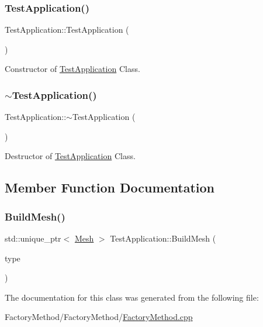 \subsubsection{\texorpdfstring{TestApplication()}{TestApplication()}}
{\footnotesize\ttfamily Test\+Application\+::\+Test\+Application (\begin{DoxyParamCaption}{ }\end{DoxyParamCaption})}



Constructor of \mbox{\hyperlink{class_test_application}{Test\+Application}} Class. 

\mbox{\label{class_test_application_ab2701e0dc10fdeabe85044794f1b334c}} 
\subsubsection{\texorpdfstring{$\sim$TestApplication()}{~TestApplication()}}
{\footnotesize\ttfamily Test\+Application\+::$\sim$\+Test\+Application (\begin{DoxyParamCaption}{ }\end{DoxyParamCaption})}



Destructor of \mbox{\hyperlink{class_test_application}{Test\+Application}} Class. 



\subsection{Member Function Documentation}
\mbox{\label{class_test_application_a5bab36dee766e9d86f7edc692e807a27}} 
\subsubsection{\texorpdfstring{BuildMesh()}{BuildMesh()}}
{\footnotesize\ttfamily std\+::unique\+\_\+ptr$<$ \mbox{\hyperlink{class_mesh}{Mesh}} $>$ Test\+Application\+::\+Build\+Mesh (\begin{DoxyParamCaption}\item[{\mbox{\hyperlink{class_m_e_s_h_t_y_p_e}{M\+E\+S\+H\+T\+Y\+PE}}}]{type }\end{DoxyParamCaption})}



The documentation for this class was generated from the following file\+:\begin{DoxyCompactItemize}
\item 
Factory\+Method/\+Factory\+Method/\mbox{\hyperlink{_factory_method_8cpp}{Factory\+Method.\+cpp}}\end{DoxyCompactItemize}
